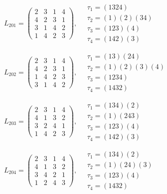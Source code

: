 $L_{201} = \begin{pmatrix} 2 & 3 & 1 & 4 \\ 4 & 2 & 3 & 1 \\ 3 & 1 & 4 & 2 \\ 1 & 4 & 2 & 3 \end{pmatrix}, \quad \begin{matrix} \tau_{1} = (1 3 2 4) \\ \tau_{2} = (1)(2)(3 4) \\ \tau_{3} = (1 2 3)(4) \\ \tau_{4} = (1 4 2)(3) \end{matrix}$

$L_{202} = \begin{pmatrix} 2 & 3 & 1 & 4 \\ 4 & 2 & 3 & 1 \\ 1 & 4 & 2 & 3 \\ 3 & 1 & 4 & 2 \end{pmatrix}, \quad \begin{matrix} \tau_{1} = (1 3)(2 4) \\ \tau_{2} = (1)(2)(3)(4) \\ \tau_{3} = (1 2 3 4) \\ \tau_{4} = (1 4 3 2) \end{matrix}$

$L_{203} = \begin{pmatrix} 2 & 3 & 1 & 4 \\ 4 & 1 & 3 & 2 \\ 3 & 2 & 4 & 1 \\ 1 & 4 & 2 & 3 \end{pmatrix}, \quad \begin{matrix} \tau_{1} = (1 3 4)(2) \\ \tau_{2} = (1)(2 4 3) \\ \tau_{3} = (1 2 3)(4) \\ \tau_{4} = (1 4 2)(3) \end{matrix}$

$L_{204} = \begin{pmatrix} 2 & 3 & 1 & 4 \\ 4 & 1 & 3 & 2 \\ 3 & 4 & 2 & 1 \\ 1 & 2 & 4 & 3 \end{pmatrix}, \quad \begin{matrix} \tau_{1} = (1 3 4)(2) \\ \tau_{2} = (1)(2 4)(3) \\ \tau_{3} = (1 2 3)(4) \\ \tau_{4} = (1 4 3 2) \end{matrix}$

